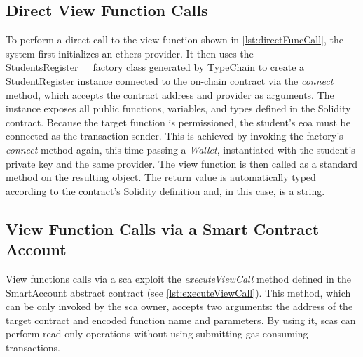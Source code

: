 \subsection{Direct View Function Calls}
To perform a direct call to the view function shown in \cref{lst:directFuncCall}, the system first initializes an ethers provider. It then uses the StudentsRegister\_\_factory class generated by TypeChain to create a StudentRegister instance connected to the on-chain contract via the \textit{connect} method, which accepts the contract address and provider as arguments. The instance exposes all public functions, variables, and types defined in the Solidity contract. 
Because the target function is permissioned, the student's \acrshort{eoa} must be connected as the transaction sender. This is achieved by invoking the factory's \textit{connect} method again, this time passing a \textit{Wallet}, instantiated with the student's private key and the same provider. The view function is then called as a standard method on the resulting object. The return value is automatically typed according to the contract's Solidity definition and, in this case, is a string.



\subsection{View Function Calls via a Smart Contract Account}
\label{ssec:viewFunctionCalls}
View functions calls via a \acrshort{sca} exploit the \textit{executeViewCall} method defined in the SmartAccount abstract contract (see \cref{lst:executeViewCall}). This method, which can be only invoked by the \acrshort{sca} owner, accepts two arguments: the address of the target contract and encoded function name and parameters. By using it, \acrshort{sca}s can perform read-only operations without using submitting gas-consuming transactions. 


